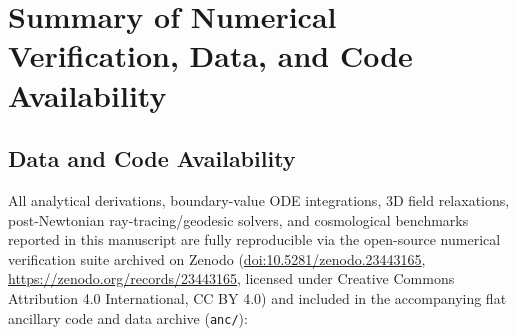 \documentclass[10pt,aps,prd,twocolumn,superscriptaddress,nofootinbib,floatfix,longbibliography,showkeys]{revtex4-2}
\begin{document}
\begin{itemize}
\end{itemize}


\section{Summary of Numerical Verification, Data, and Code Availability}\label{sec:9}


\subsection{Data and Code Availability}\label{sec:9.1}

All analytical derivations, boundary-value ODE integrations, 3D field relaxations, post-Newtonian ray-tracing/geodesic solvers, and cosmological benchmarks reported in this manuscript are fully reproducible via the open-source numerical verification suite archived on Zenodo (\href{https://doi.org/10.5281/zenodo.23443165}{doi:10.5281/zenodo.23443165}, \href{https://zenodo.org/records/23443165}{https://zenodo.org/records/23443165}, licensed under Creative Commons Attribution 4.0 International, CC BY 4.0) and included in the accompanying flat ancillary code and data archive (\texttt{anc/}):
\end{document}
